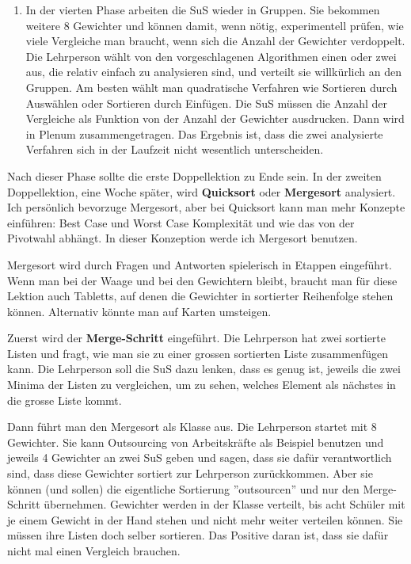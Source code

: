 \documentclass[
	12pt, %
	german, %
]{fphw}
\begin{document}
\begin{enumerate}[1.]
\item In der vierten Phase arbeiten die SuS wieder in Gruppen. Sie bekommen weitere 8 Gewichter und können damit, wenn nötig, experimentell prüfen, wie viele Vergleiche man braucht, wenn sich die Anzahl der Gewichter verdoppelt. Die Lehrperson wählt von den vorgeschlagenen Algorithmen einen oder zwei aus, die relativ einfach zu analysieren sind, und verteilt sie willkürlich an den Gruppen. Am besten wählt man quadratische Verfahren wie Sortieren durch Auswählen oder Sortieren durch Einfügen. Die SuS müssen die Anzahl der Vergleiche als Funktion von der Anzahl der Gewichter ausdrucken. Dann wird in Plenum zusammengetragen. Das Ergebnis ist, dass die zwei analysierte Verfahren sich in der Laufzeit nicht wesentlich unterscheiden.
\end{enumerate}

Nach dieser Phase sollte die erste Doppellektion zu Ende sein. In der zweiten Doppellektion, eine Woche später, wird \textbf{Quicksort} oder \textbf{Mergesort} analysiert. Ich persönlich bevorzuge Mergesort, aber bei Quicksort kann man mehr Konzepte einführen: Best Case und Worst Case Komplexität und wie das von der Pivotwahl abhängt. In dieser Konzeption werde ich Mergesort benutzen.

Mergesort wird durch Fragen und Antworten spielerisch in Etappen eingeführt. Wenn man bei der Waage und bei den Gewichtern bleibt, braucht man für diese Lektion auch Tabletts, auf denen die Gewichter in sortierter Reihenfolge stehen können. Alternativ könnte man auf Karten umsteigen.

Zuerst wird der \textbf{Merge-Schritt} eingeführt. Die Lehrperson hat zwei sortierte Listen und fragt, wie man sie zu einer grossen sortierten Liste zusammenfügen kann. Die Lehrperson soll die SuS dazu lenken, dass es genug ist, jeweils die zwei Minima der Listen zu vergleichen, um zu sehen, welches Element als nächstes in die grosse Liste kommt.

Dann führt man den Mergesort als Klasse aus. Die Lehrperson startet mit 8 Gewichter. Sie kann Outsourcing von Arbeitskräfte als Beispiel benutzen und jeweils 4 Gewichter an zwei SuS geben und sagen, dass sie dafür verantwortlich sind, dass diese Gewichter sortiert zur Lehrperson zurückkommen. Aber sie können (und sollen) die eigentliche Sortierung ''outsourcen'' und nur den Merge-Schritt übernehmen. Gewichter werden in der Klasse verteilt, bis acht Schüler mit je einem Gewicht in der Hand stehen und nicht mehr weiter verteilen können. Sie müssen ihre Listen doch selber sortieren. Das Positive daran ist, dass sie dafür nicht mal einen Vergleich brauchen.
\end{document}
